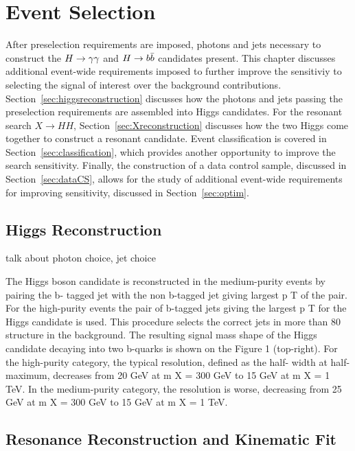 \chapter{Event Selection\label{ch:selection}}

After preselection requirements are imposed, photons and jets necessary to construct the $H\to\gamma\gamma$ and $H\to b\bar{b}$ candidates present. This chapter discusses additional event-wide requirements imposed to further
improve the sensitiviy to selecting the signal of interest over the background contributions.
Section~\ref{sec:higgsreconstruction} discusses how the photons and jets passing the preselection
requirements are assembled into Higgs candidates. For the resonant search $X\rightarrow HH$,
Section~\ref{sec:Xreconstruction} discusses how the two Higgs come together to construct a resonant
candidate. Event classification is covered in Section~\ref{sec:classification}, which provides
another opportunity to improve the search sensitivity. Finally, the construction of a data control
sample, discussed in Section~\ref{sec:dataCS}, allows for the study of additional event-wide
requirements for improving sensitivity, discussed in Section~\ref{sec:optim}.

\section{Higgs Reconstruction\label{sec:higgsreconstruction}}
talk about photon choice, jet choice

The  Higgs  boson  candidate  is  reconstructed  in  the  medium-purity  events  by  pairing  the  b-
tagged jet with the non b-tagged jet giving largest
p
T
of the pair.  For the high-purity events
the pair of b-tagged jets giving the largest
p
T
for the Higgs candidate is used.  This procedure
selects the correct jets in more than 80%
structure in the background.
The resulting signal mass shape of the Higgs candidate decaying into two b-quarks is shown on
the Figure 1 (top-right). For the high-purity category, the typical resolution, defined as the half-
width at half-maximum, decreases from 20 GeV at
m
X
=
300 GeV to 15 GeV at
m
X
=
1 TeV. In
the medium-purity category, the resolution is worse, decreasing from 25 GeV at
m
X
=
300 GeV
to 15 GeV at
m
X
=
1 TeV.



\section{Resonance Reconstruction and Kinematic Fit\label{sec:Xreconstruction}}

